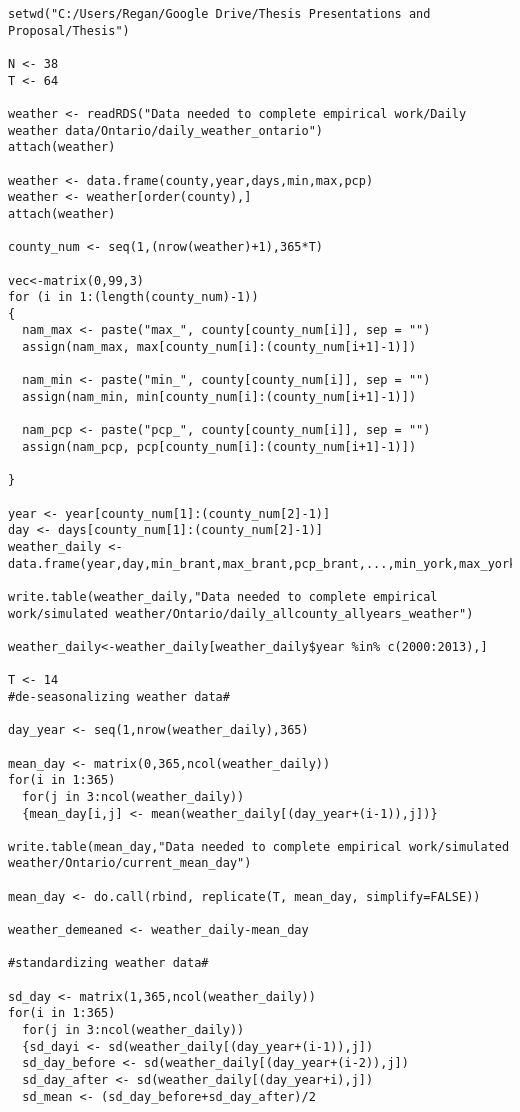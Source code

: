 \begin{lstlisting}
setwd("C:/Users/Regan/Google Drive/Thesis Presentations and Proposal/Thesis")

N <- 38
T <- 64

weather <- readRDS("Data needed to complete empirical work/Daily weather data/Ontario/daily_weather_ontario")
attach(weather)

weather <- data.frame(county,year,days,min,max,pcp)
weather <- weather[order(county),]
attach(weather)

county_num <- seq(1,(nrow(weather)+1),365*T)

vec<-matrix(0,99,3)
for (i in 1:(length(county_num)-1))
{
  nam_max <- paste("max_", county[county_num[i]], sep = "")
  assign(nam_max, max[county_num[i]:(county_num[i+1]-1)])
  
  nam_min <- paste("min_", county[county_num[i]], sep = "")
  assign(nam_min, min[county_num[i]:(county_num[i+1]-1)])
  
  nam_pcp <- paste("pcp_", county[county_num[i]], sep = "")
  assign(nam_pcp, pcp[county_num[i]:(county_num[i+1]-1)])
 
}

year <- year[county_num[1]:(county_num[2]-1)]
day <- days[county_num[1]:(county_num[2]-1)]
weather_daily <- data.frame(year,day,min_brant,max_brant,pcp_brant,...,min_york,max_york,pcp_york)

write.table(weather_daily,"Data needed to complete empirical work/simulated weather/Ontario/daily_allcounty_allyears_weather")

weather_daily<-weather_daily[weather_daily$year %in% c(2000:2013),]

T <- 14
#de-seasonalizing weather data#

day_year <- seq(1,nrow(weather_daily),365)

mean_day <- matrix(0,365,ncol(weather_daily))
for(i in 1:365)
  for(j in 3:ncol(weather_daily))
  {mean_day[i,j] <- mean(weather_daily[(day_year+(i-1)),j])}

write.table(mean_day,"Data needed to complete empirical work/simulated weather/Ontario/current_mean_day")

mean_day <- do.call(rbind, replicate(T, mean_day, simplify=FALSE))

weather_demeaned <- weather_daily-mean_day

#standardizing weather data#

sd_day <- matrix(1,365,ncol(weather_daily))
for(i in 1:365)
  for(j in 3:ncol(weather_daily))
  {sd_dayi <- sd(weather_daily[(day_year+(i-1)),j])
  sd_day_before <- sd(weather_daily[(day_year+(i-2)),j])
  sd_day_after <- sd(weather_daily[(day_year+i),j])
  sd_mean <- (sd_day_before+sd_day_after)/2
  

\end{lstlisting}
